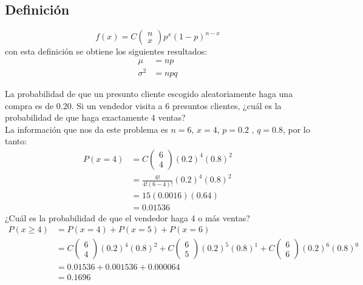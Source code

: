 \subsection{Definición}
\begin{equation}
    f(x) = C\left(\begin{matrix}
            n \\
            x
        \end{matrix}\right) p^x (1-p)^{n-x}
\end{equation}
con esta definición se obtiene los siguientes resultados:
\begin{align*}
    \mu      & = np  \\
    \sigma^2 & = npq
\end{align*}
\begin{ejemplo}
    La probabilidad de que un presunto cliente escogido aleatoriamente haga una compra es de 0.20. Si un vendedor visita a 6 presuntos clientes, ¿cuál es la probabilidad de que haga exactamente 4 ventas?\\
    La información que nos da este problema es $n=6$, $x=4$, $p=0.2$ , $q=0.8$, por lo tanto:
    \begin{align*}
        P(x=4) & = C\left(\begin{matrix}
            6 \\
            4
        \end{matrix}\right) (0.2)^{4} (0.8)^{2} \\
               & = \frac{6!}{4!(6-4)!} (0.2)^4 (0.8)^2                         \\
               & = 15(0.0016)(0.64)                                            \\
               & =0.01536
    \end{align*}
    ¿Cuál es la probabilidad de que el vendedor haga 4 o más ventas?
    \begin{align*}
        P(x\geq 4) & = P(x=4)+P(x=5)+P(x=6)                                                                                                                                                                \\
                   & = C\left(\begin{matrix}
            6 \\
            4
        \end{matrix}\right) (0.2)^{4} (0.8)^{2}+C\left(\begin{matrix}
            6 \\
            5
        \end{matrix}\right) (0.2)^{5} (0.8)^{1}+C\left(\begin{matrix}
            6 \\
            6
        \end{matrix}\right) (0.2)^{6} (0.8)^{0} \\
                   & = 0.01536+0.001536+0.000064                                                                                                                                                           \\
                   & = 0.1696
    \end{align*}
\end{ejemplo}